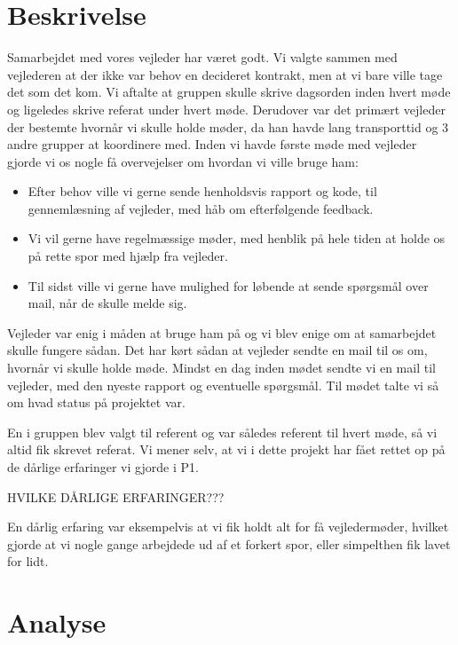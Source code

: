 \section{Beskrivelse}
Samarbejdet med vores vejleder har været godt. Vi valgte sammen med vejlederen at der ikke var behov en decideret kontrakt, men at vi bare ville tage det som det kom. Vi aftalte at gruppen skulle skrive dagsorden inden hvert møde og ligeledes skrive referat under hvert møde. Derudover var det primært vejleder der bestemte hvornår vi skulle holde møder, da han havde lang transporttid og 3 andre grupper at koordinere med. Inden vi havde første møde med vejleder gjorde vi os nogle få overvejelser om hvordan vi ville bruge ham:
\begin{itemize}
\item	Efter behov ville vi gerne sende henholdsvis rapport og kode, til gennemlæsning af vejleder, med håb om efterfølgende feedback.

\item	Vi vil gerne have regelmæssige møder, med henblik på hele tiden at holde os på rette spor med hjælp fra vejleder.

\item Til sidst ville vi gerne have mulighed for løbende at sende spørgsmål over mail, når de skulle melde sig.
\end{itemize}
Vejleder var enig i måden at bruge ham på og vi blev enige om at samarbejdet skulle fungere sådan. Det har kørt sådan at vejleder sendte en mail til os om, hvornår vi skulle holde møde. Mindst en dag inden mødet sendte vi en mail til vejleder, med den nyeste rapport og eventuelle spørgsmål. Til mødet talte vi så om hvad status på projektet var. 

En i gruppen blev valgt til referent og var således referent til hvert møde, så vi altid fik skrevet referat. Vi mener selv, at vi i dette projekt har fået rettet op på de dårlige erfaringer vi gjorde i P1.


HVILKE DÅRLIGE ERFARINGER???


En dårlig erfaring var eksempelvis at vi fik holdt alt for få vejledermøder, hvilket gjorde at vi nogle gange arbejdede ud af et forkert spor, eller simpelthen fik lavet for lidt. 

\section{Analyse}

